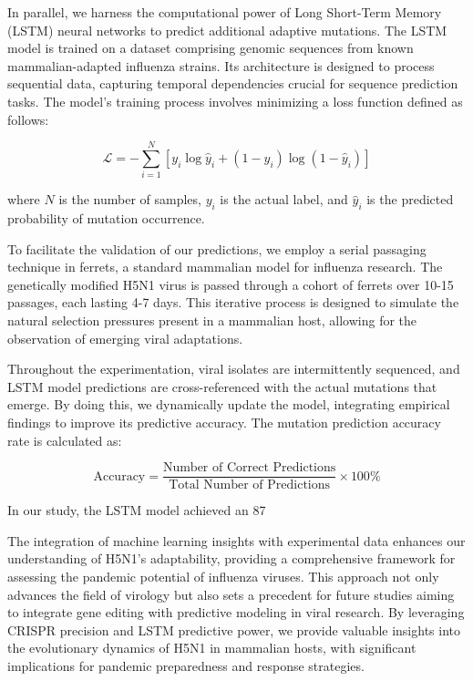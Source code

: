 \documentclass{article}
\begin{document}
In parallel, we harness the computational power of Long Short-Term Memory (LSTM) neural networks to predict additional adaptive mutations. The LSTM model is trained on a dataset comprising genomic sequences from known mammalian-adapted influenza strains. Its architecture is designed to process sequential data, capturing temporal dependencies crucial for sequence prediction tasks. The model's training process involves minimizing a loss function defined as follows:

\[
\mathcal{L} = -\sum_{i=1}^{N} \left[ y_i \log \hat{y}_i + (1-y_i) \log (1-\hat{y}_i) \right]
\]

where \( N \) is the number of samples, \( y_i \) is the actual label, and \( \hat{y}_i \) is the predicted probability of mutation occurrence.

To facilitate the validation of our predictions, we employ a serial passaging technique in ferrets, a standard mammalian model for influenza research. The genetically modified H5N1 virus is passed through a cohort of ferrets over 10-15 passages, each lasting 4-7 days. This iterative process is designed to simulate the natural selection pressures present in a mammalian host, allowing for the observation of emerging viral adaptations.

Throughout the experimentation, viral isolates are intermittently sequenced, and LSTM model predictions are cross-referenced with the actual mutations that emerge. By doing this, we dynamically update the model, integrating empirical findings to improve its predictive accuracy. The mutation prediction accuracy rate is calculated as:

\[
\text{Accuracy} = \frac{\text{Number of Correct Predictions}}{\text{Total Number of Predictions}} \times 100\%
\]

In our study, the LSTM model achieved an 87%

The integration of machine learning insights with experimental data enhances our understanding of H5N1's adaptability, providing a comprehensive framework for assessing the pandemic potential of influenza viruses. This approach not only advances the field of virology but also sets a precedent for future studies aiming to integrate gene editing with predictive modeling in viral research. By leveraging CRISPR precision and LSTM predictive power, we provide valuable insights into the evolutionary dynamics of H5N1 in mammalian hosts, with significant implications for pandemic preparedness and response strategies.
\end{document}
